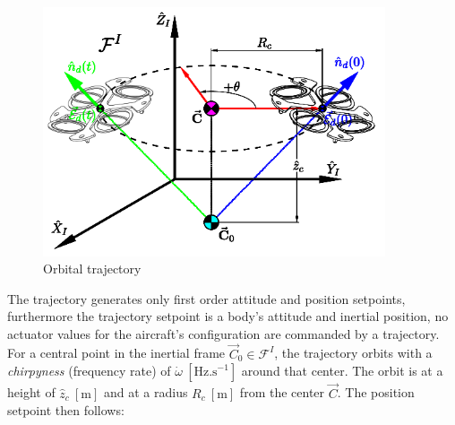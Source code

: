 \begin{figure}[htbp]
\vspace{-10pt}
\centering
\includegraphics[width=0.9\textwidth]{figs/trajectory}
\vspace{-12pt}
\caption{Orbital trajectory}
\label{fig:trajectory}
\vspace{-20pt}
\end{figure}
\par
The trajectory generates only first order attitude and position setpoints, furthermore the trajectory setpoint is a body's attitude and inertial position, no actuator values for the aircraft's configuration are commanded by a trajectory. For a central point in the inertial frame $\vec{C}_0\in\mathcal{F}^I$, the trajectory orbits with a \emph{chirpyness} (frequency rate) of $\dot{\omega}~[\text{Hz.s}^{-1}]$ around that center. The orbit is at a height of $\hat{z}_c~[\text{m}]$ and at a radius $R_c~[\text{m}]$ from the center $\vec{C}$. The position setpoint then follows:
